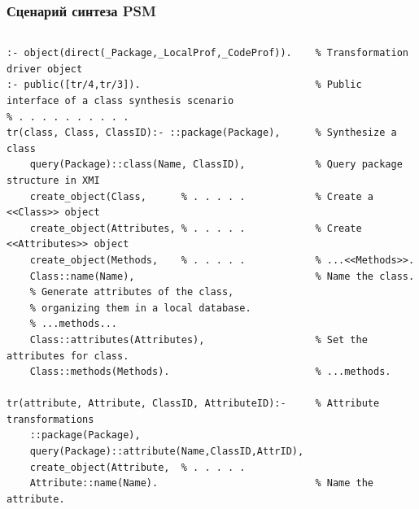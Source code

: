 \documentclass[10pt]{beamer}
\begin{document}
\begin{frame}[fragile]
  \frametitle{Сценарий синтеза PSM}

  \begin{columns}
    \begin{column}{0.6\textwidth}
\begin{verbatim}
:- object(direct(_Package,_LocalProf,_CodeProf)).    % Transformation driver object
:- public([tr/4,tr/3]).                              % Public interface of a class synthesis scenario
% . . . . . . . . . .
tr(class, Class, ClassID):- ::package(Package),      % Synthesize a class
    query(Package)::class(Name, ClassID),            % Query package structure in XMI
    create_object(Class,      % . . . . .            % Create a <<Class>> object
    create_object(Attributes, % . . . . .            % Create <<Attributes>> object
    create_object(Methods,    % . . . . .            % ...<<Methods>>.
    Class::name(Name),                               % Name the class.
    % Generate attributes of the class,
    % organizing them in a local database.
    % ...methods...
    Class::attributes(Attributes),                   % Set the attributes for class.
    Class::methods(Methods).                         % ...methods.

tr(attribute, Attribute, ClassID, AttributeID):-     % Attribute transformations
    ::package(Package),
    query(Package)::attribute(Name,ClassID,AttrID),
    create_object(Attribute,  % . . . . .
    Attribute::name(Name).                           % Name the attribute.


\end{verbatim}
\end{column}
\end{columns}
\end{frame}
\end{document}
